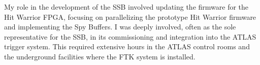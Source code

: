 
My role in the development of the SSB involved updating the firmware for the Hit Warrior FPGA, focusing on parallelizing the prototype Hit Warrior firmware and implementing the Spy Buffers. 
I was deeply involved, often as the sole representative for the SSB, in its commissioning and integration into the ATLAS trigger system. This required extensive hours in the ATLAS control rooms and the underground facilities where the FTK system is installed.




